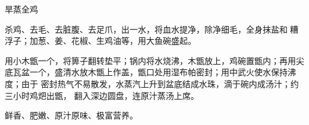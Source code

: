 \begin{recipe}{旱蒸全鸡}

\ingredients


\preparation

\step 杀鸡、去毛、去脏腹、去足爪，出一水，将血水提净，除净细毛，全身抹盐和𰪿糟
浮子；加葱、姜、花椒、生鸡油等，用大鱼碗盛起。

\step 用小木甑一个，将箅子翻转垫平；锅内将水烧沸，木甑放上，鸡碗置甑内；再用尖
底瓦盆一个，盛清水放木甑上作盖，甑口处用湿布帕密封；用中武火使水保持沸度；由于
密封热气不易散发，水蒸汽上升到盆底结成水珠，滴于碗内成汤汁；约三小时鸡𤆵出甑，
翻入深边圆盘，连原汁蒸汤上席。

\features

鲜香、肥嫩、原汁原味、极富营养。

\end{recipe}

